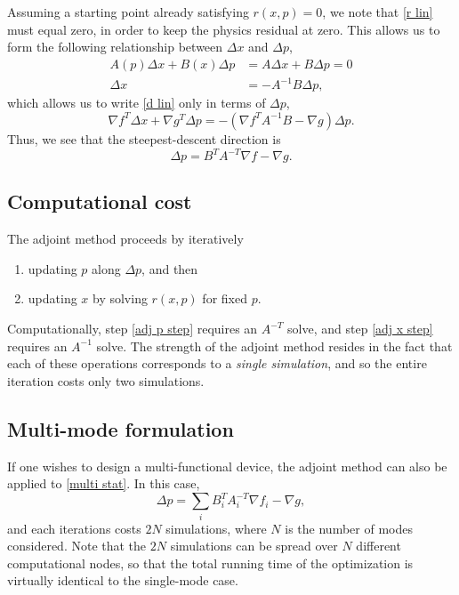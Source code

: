 \documentclass{article}
\begin{document}
Assuming a starting point already satisfying $r(x,p) = 0$,
    we note that \eqref{r lin} must equal zero,
    in order to keep the physics residual at zero.
This allows us to form the following relationship between
    $\Delta x$ and $\Delta p$,
    \begin{subequations}\begin{align}
    A(p) \Delta x + B(x) \Delta p &= A \Delta x + B \Delta p = 0 \\
    \Delta x &= - A^{-1} B \Delta p,
    \end{align}\end{subequations}
    which allows us to write \eqref{d lin} only in terms of $\Delta p$,
    \begin{equation}
    \nabla f^T \Delta x + \nabla g^T \Delta p =
        - (\nabla f^T A^{-1} B - \nabla g) \Delta p.
    \end{equation}
Thus, we see that the steepest-descent direction is
    \begin{equation}
    \Delta p = B^T A^{-T} \nabla f - \nabla g.
    \end{equation}

\subsection{Computational cost}
The adjoint method proceeds by iteratively
    \begin{enumerate}
    \item updating $p$ along $\Delta p$, and then \label{adj p step}
    \item updating $x$ by solving $r(x,p)$ for fixed $p$. \label{adj x step}
    \end{enumerate}

Computationally, step \ref{adj p step} requires an $A^{-T}$ solve,
    and step \ref{adj x step} requires an $A^{-1}$ solve.
The strength of the adjoint method resides in the fact that 
    each of these operations corresponds to a \emph{single simulation},
    and so the entire iteration costs only two simulations.

\subsection{Multi-mode formulation}
If one wishes to design a multi-functional device,
    the adjoint method can also be applied to \eqref{multi stat}.
In this case,
    \begin{equation}
    \Delta p = \sum_i B_i^T A_i^{-T} \nabla f_i - \nabla g,
    \end{equation}
    and each iterations costs $2N$ simulations,
    where $N$ is the number of modes considered.
Note that the $2N$ simulations can be spread over
    $N$ different computational nodes,
    so that the total running time of the optimization is   
    virtually identical to the single-mode case.
    
\end{document}
